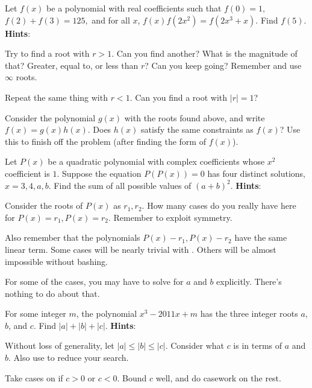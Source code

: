\documentclass[11pt,titlepage]{scrartcl}
\newenvironment{hint}{\footnotesize \normalfont \textbf{Hints}:}{\hspace{-0.5ex}}
\begin{document}
\begin{problem}
Let $f(x)$ be a polynomial with real coefficients such that $f(0) = 1,$ $f(2)+f(3)=125,$ and for all $x$, $f(x)f(2x^{2})=f(2x^{3}+x).$ Find $f(5).$
\begin{hint}
\begin{addhint}{
Try to find a root with $r>1$. Can you find another? What is the magnitude of that? Greater, equal to, or less than $r$? Can you keep going? Remember  and use $\infty$ roots.
}\end{addhint}
\begin{addhint}{
Repeat the same thing with $r<1$. Can you find a root with $|r|=1$?
}\end{addhint}
\begin{addhint}{
Consider the polynomial $g(x)$ with the roots found above, and write $f(x)=g(x)h(x)$. Does $h(x)$ satisfy the same constraints as $f(x)$? Use this to finish off the problem (after finding the form of $f(x)$).
}\end{addhint}
\end{hint}
\end{problem}
\begin{problem}
Let $P(x)$ be a quadratic polynomial with complex coefficients whose $x^2$ coefficient is $1.$ Suppose the equation $P(P(x))=0$ has four distinct solutions, $x=3,4,a,b.$ Find the sum of all possible values of $(a+b)^2.$
\begin{hint}
\begin{addhint}{
Consider the roots of $P(x)$ as $r_1,r_2$. How many cases do you really have here for $P(x)=r_1,P(x)=r_2$. Remember to exploit symmetry.
}\end{addhint}
\begin{addhint}{
Also remember that the polynomials $P(x)-r_1,P(x)-r_2$ have the same linear term. Some cases will be nearly trivial with . Others will be almost impossible without bashing.
}\end{addhint}
\begin{addhint}{
For some of the cases, you may have to solve for $a$ and $b$ explicitly. There's nothing to do about that.
}\end{addhint}
\end{hint}
\end{problem}
\begin{problem}
For some integer $m$, the polynomial $x^3 - 2011x + m$ has the three integer roots $a$, $b$, and $c$. Find $|a| + |b| + |c|$.
\begin{hint}
\begin{addhint}{
Without loss of generality, let $|a|\leq |b|\leq |c|$. Consider what $c$ is in terms of $a$ and $b$. Also use  to reduce your search.
}\end{addhint}
\begin{addhint}{
Take cases on if $c>0$ or $c<0$. Bound $c$ well, and do casework on the rest.
}\end{addhint}
\end{hint}
\end{problem}
\end{document}
